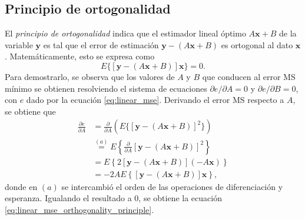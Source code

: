 \documentclass[a4paper]{report}
\newcommand{\x}{\mathbf{x}}
\newcommand{\y}{\mathbf{y}}
\begin{document}
\subsection{Principio de ortogonalidad}

El \emph{principio de ortogonalidad} indica que el estimador lineal óptimo \(A\x+B\) de la variable \(\y\) es tal que el error de estimación \(\y-(A\x+B)\) es ortogonal al dato \(\x\). Matemáticamente, esto se expresa como
\begin{equation}\label{eq:linear_mse_orthogonality_principle}
 E\{[\y-(A\x+B)]\x\}=0.
\end{equation}
Para demostrarlo, se observa que los valores de \(A\) y \(B\) que conducen al error MS mínimo se obtienen resolviendo el sistema de ecuaciones \(\partial e/\partial A=0\) y \(\partial e/\partial B=0\), con \(e\) dado por la ecuación \ref{eq:linear_mse}. Derivando el error MS respecto a \(A\), se obtiene que
\begin{align*}
 \frac{\partial e}{\partial A}&=\frac{\partial}{\partial A}\left(E\{[\y-(A\x+B)]^2\}\right)\\
  &\overset{(a)}{=}E\left\{\frac{\partial}{\partial A}[\y-(A\x+B)]^2\right\}\\
  &=E\left\{2[\y-(A\x+B)](-A\x)\right\}\\
  &=-2AE\left\{[\y-(A\x+B)]\x\right\},
\end{align*}
donde en \((a)\) se intercambió el orden de las operaciones de diferenciación y esperanza. Igualando el resultado a 0, se obtiene la ecuación \ref{eq:linear_mse_orthogonality_principle}.
\end{document}
